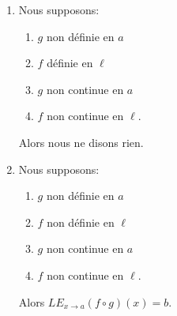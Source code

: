\begin{theorem}
\begin{enumerate}
\begin{multicols}{2}
\begin{enumerate}
                \item \( f\) définie en \( \ell\)
                \item \( g\) non continue en \( a\)
                \item \( f\) continue en \( \ell\).
                \end{enumerate}
            \end{multicols}
            Alors \( {LE}_{x\to a}(f\circ g)(x)=b\).
        \item   \label{ITEMooOAAVooSjoYOv}      %
            Nous supposons:
            \begin{multicols}{2}
                \begin{enumerate}
                \item \( g\) non définie en \( a\)
                \item \( f\) définie en \( \ell\)
                \item \( g\) non continue en \( a\)
                \item \( f\) non continue en \( \ell\).
                \end{enumerate}
            \end{multicols}
            Alors nous ne disons rien.
        \item   \label{ITEMooPVZKooBXJARI}      %
            Nous supposons:
            \begin{multicols}{2}
                \begin{enumerate}
                \item \( g\) non définie en \( a\)
                \item \( f\) non définie en \( \ell\)
                \item \( g\) non continue en \( a\)
                \item \( f\) non continue en \( \ell\).
                \end{enumerate}
            \end{multicols}
            Alors \( {LE}_{x\to a}(f\circ g)(x)=b\).
    \end{enumerate}
\end{theorem}

